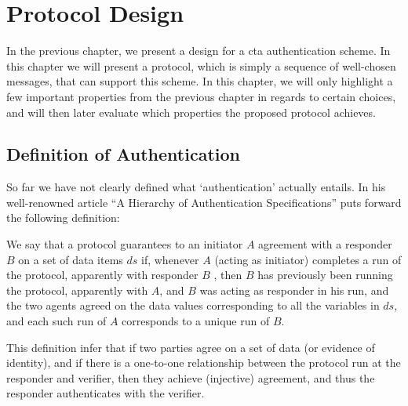 \chapter{Protocol Design}\label{ch:protocol}




In the previous chapter, we present a design for a \gls{cta} authentication scheme. In this chapter we will present a protocol, which is simply a sequence of well-chosen messages, that can support this scheme. In this chapter, we will only highlight a few important properties from the previous chapter in regards to certain choices, and will then later evaluate which properties the proposed protocol achieves.

\section{Definition of Authentication}

So far we have not clearly defined what `authentication' actually entails. In his well-renowned article ``A Hierarchy of Authentication Specifications'' \citet{lowe1997hierarchy} puts forward the following definition:

\begin{definition}
We say that a protocol guarantees to an initiator $A$ agreement with a responder $B$ on a set of data items $ds$ if, whenever $A$ (acting as initiator) completes a run of the protocol, apparently with responder $B$ , then $B$ has previously been running the protocol, apparently with $A$, and $B$ was acting as responder in his run, and the two agents agreed on the data values corresponding to all the variables in $ds$, and each such run of $A$ corresponds to a unique run of $B$.
\end{definition}

This definition infer that if two parties agree on a set of data (or evidence of identity), and if there is a one-to-one relationship between the protocol run at the responder and verifier, then they achieve (injective) agreement, and thus the responder authenticates with the verifier.

